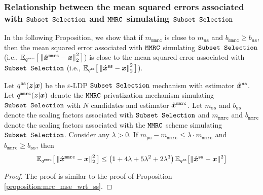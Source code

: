 \subsubsection{Relationship between the mean squared errors associated with \texorpdfstring{$\texttt{Subset Selection}$}{Subset Selection} and \texorpdfstring{$\texttt{MMRC}$}{MMRC} simulating \texorpdfstring{$\texttt{Subset Selection}$}{Subset Selection}}\label{appendix:mmrc_ss_scaling_mse}
In the following Proposition,
we show that if $m_{\texttt{mmrc}}$ is close to $m_{\texttt{ss}}$ and $b_{\texttt{mmrc}} \geq b_{\texttt{ss}}$, then the mean squared error associated with $\texttt{MMRC}$ simulating $\texttt{Subset Selection}$ (i.e., $\mathbb{E}_{q^{\texttt{mmrc}}} \big[ \left\lVert  \hat{{\boldsymbol{x}}}^\texttt{mmrc} - {\boldsymbol{x}} \right\rVert^2_2  \big]$) is close to the mean squared error associated with $\texttt{Subset Selection}$ (i.e., $\mathbb{E}_{q^{\texttt{ss}}} \big[ \left\lVert  \hat{{\boldsymbol{x}}}^\texttt{ss} - {\boldsymbol{x}} \right\rVert^2_2  \big]$).
\begin{proposition}\label{proposition:mmrc_mse_wrt_ss}
Let $q^{\texttt{ss}}({\boldsymbol{z}} | {\boldsymbol{x}})$ be the  $\varepsilon$-LDP \emph{$\texttt{Subset Selection}$} mechanism with estimator $\hat{{\boldsymbol{x}}}^{\texttt{ss}}$. Let $q^{\texttt{mmrc}}({\boldsymbol{z}}|{\boldsymbol{x}})$ denote the \emph{$\texttt{MMRC}$} privatization mechanism simulating \emph{$\texttt{Subset Selection}$} with $N$ candidates and estimator $\hat{{\boldsymbol{x}}}^{\texttt{mmrc}}$.
Let $m_{\texttt{ss}}$ and $b_{\texttt{ss}}$ denote the scaling factors  associated with \emph{$\texttt{Subset Selection}$} and $m_\texttt{mmrc}$ and $b_\texttt{mmrc}$ denote the scaling factors associated with the \emph{$\texttt{MMRC}$} scheme simulating \emph{$\texttt{Subset Selection}$}. Consider any $\lambda > 0$. If $m_{\texttt{pu}} - m_\texttt{mmrc} \leq \lambda \cdot m_\texttt{mmrc}$ and $b_{\texttt{mmrc}} \geq b_{\texttt{ss}}$, then 
  \begin{align}
    \mathbb{E}_{q^{\texttt{mmrc}}} \big[ \left\lVert  \hat{{\boldsymbol{x}}}^\texttt{mmrc} - {\boldsymbol{x}} \right\rVert^2_2  \big]  \leq  \left( 1+4\lambda +5\lambda^2 + 2\lambda^3 \right)  \mathbb{E}_{q^{\texttt{ss}}}\big[\|\hat{{\boldsymbol{x}}}^{\texttt{ss}} - {\boldsymbol{x}}\|^2\big]
\end{align}
\end{proposition}
\begin{proof}
The proof is similar to the proof of Proposition \ref{proposition:mrc_mse_wrt_ss}.
\end{proof}

